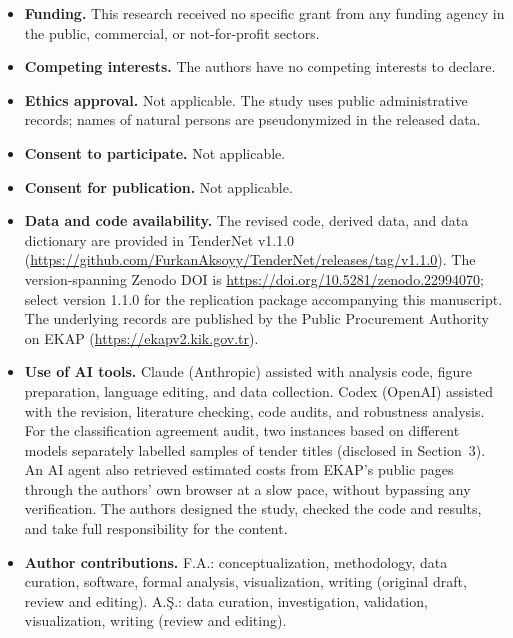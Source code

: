 \documentclass[pdflatex,sn-apa]{sn-jnl}
\begin{document}
\begin{itemize}
\item \textbf{Funding.} This research received no specific grant from any funding agency in the public, commercial, or not-for-profit sectors.
\item \textbf{Competing interests.} The authors have no competing interests to declare.
\item \textbf{Ethics approval.} Not applicable. The study uses public administrative records; names of natural persons are pseudonymized in the released data.
\item \textbf{Consent to participate.} Not applicable.
\item \textbf{Consent for publication.} Not applicable.
\item \textbf{Data and code availability.} The revised code, derived data, and data dictionary are provided in TenderNet v1.1.0 (\url{https://github.com/FurkanAksoyy/TenderNet/releases/tag/v1.1.0}). The version-spanning Zenodo DOI is \url{https://doi.org/10.5281/zenodo.22994070}; select version 1.1.0 for the replication package accompanying this manuscript. The underlying records are published by the Public Procurement Authority on EKAP (\url{https://ekapv2.kik.gov.tr}).
\item \textbf{Use of AI tools.} Claude (Anthropic) assisted with analysis code, figure preparation, language editing, and data collection. Codex (OpenAI) assisted with the revision, literature checking, code audits, and robustness analysis. For the classification agreement audit, two instances based on different models separately labelled samples of tender titles (disclosed in Section~3). An AI agent also retrieved estimated costs from EKAP's public pages through the authors' own browser at a slow pace, without bypassing any verification. The authors designed the study, checked the code and results, and take full responsibility for the content.
\item \textbf{Author contributions.} F.A.: conceptualization, methodology, data curation, software, formal analysis, visualization, writing (original draft, review and editing). A.Ş.: data curation, investigation, validation, visualization, writing (review and editing).
\end{itemize}


\end{document}
